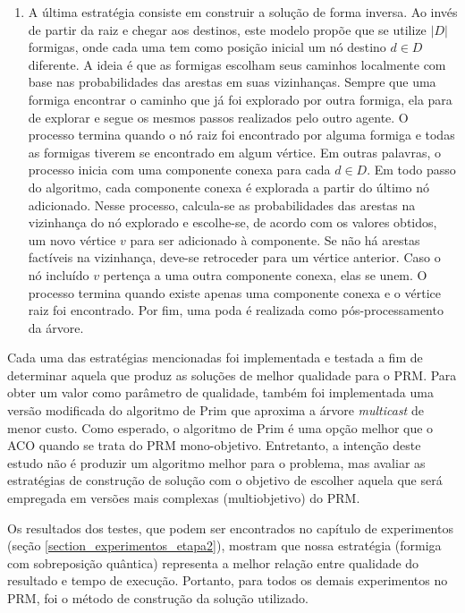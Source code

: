 \begin{enumerate}
	\item A última estratégia consiste em construir a solução de forma inversa. Ao invés de partir da raiz e chegar aos destinos, este modelo propõe que se utilize $|D|$ formigas, onde cada uma tem como posição inicial um nó destino $d \in D$ diferente. A ideia é que as formigas escolham seus caminhos localmente com base nas probabilidades das arestas em suas vizinhanças. Sempre que uma formiga encontrar o caminho que já foi explorado por outra formiga, ela para de explorar e segue os mesmos passos realizados pelo outro agente. O processo termina quando o nó raiz foi encontrado por alguma formiga e todas as formigas tiverem se encontrado em algum vértice. Em outras palavras, o processo inicia com uma componente conexa para cada $d \in D$. Em todo passo do algoritmo, cada componente conexa é explorada a partir do último nó adicionado. Nesse processo, calcula-se as probabilidades das arestas na vizinhança do nó explorado e escolhe-se, de acordo com os valores obtidos, um novo vértice $v$ para ser adicionado à componente. Se não há arestas factíveis na vizinhança, deve-se retroceder para um vértice anterior. Caso o nó incluído $v$ pertença a uma outra componente conexa, elas se unem. O processo termina quando existe apenas uma componente conexa e o vértice raiz foi encontrado. Por fim, uma poda é realizada como pós-processamento da árvore. 
\end{enumerate}

Cada uma das estratégias mencionadas foi implementada e testada a fim de determinar aquela que produz as soluções de melhor qualidade para o PRM. Para obter um valor como parâmetro de qualidade, também foi implementada uma versão modificada do algoritmo de Prim \cite{Prim1957} que aproxima a árvore \textit{multicast} de menor custo. Como esperado, o algoritmo de Prim é uma opção melhor que o ACO quando se trata do PRM mono-objetivo. Entretanto, a intenção deste estudo não é produzir um algoritmo melhor para o problema, mas avaliar as estratégias de construção de solução com o objetivo de escolher aquela que será empregada em versões mais complexas (multiobjetivo) do PRM.

Os resultados dos testes, que podem ser encontrados no capítulo de experimentos (seção \ref{section_experimentos_etapa2}), mostram que nossa estratégia (formiga com sobreposição quântica) representa a melhor relação entre qualidade do resultado e tempo de execução. Portanto, para todos os demais experimentos no PRM, foi o método de construção da solução utilizado.


